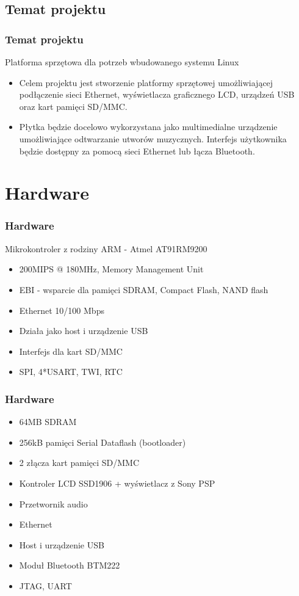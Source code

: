 \documentclass{beamer}
\newenvironment{ramka}{\begin{frame}}
{
		\end{frame}
}
\begin{document}
	\subsection{Temat projektu}
	\begin{ramka}
		\frametitle{Temat projektu}
		\begin{block}{Platforma sprzętowa dla potrzeb wbudowanego systemu Linux}
			\begin{itemize}
			\item<1->Celem projektu jest stworzenie platformy sprzętowej umożliwiającej podłączenie sieci Ethernet, wyświetlacza graficznego LCD, urządzeń USB oraz kart pamięci SD/MMC.\\
			\item<2->Płytka będzie docelowo wykorzystana jako multimedialne urządzenie umożliwiające odtwarzanie utworów muzycznych. Interfejs użytkownika będzie dostępny za pomocą sieci Ethernet lub łącza Bluetooth.
			\end{itemize}
		\end{block}
	\end{ramka} 
	
	\section{Hardware}
	\begin{ramka}
		\frametitle{Hardware}
		\begin{block}{Mikrokontroler z rodziny ARM - Atmel AT91RM9200}
			\begin{itemize}
				\item<2-> 200MIPS @ 180MHz, Memory Management Unit
				\item<3-> EBI - wsparcie dla pamięci SDRAM, Compact Flash, NAND flash
				\item<4-> Ethernet 10/100 Mbps
				\item<5-> Działa jako host i urządzenie USB
				\item<6-> Interfejs dla kart SD/MMC
				\item<7-> SPI, 4*USART, TWI, RTC
			\end{itemize}
		\end{block}
	\end{ramka} 
	
	\begin{ramka}
		\frametitle{Hardware}
		\begin{itemize}
			\item<1-> 64MB SDRAM
			\item<1-> 256kB pamięci Serial Dataflash (bootloader)
			\item<1-> 2 złącza kart pamięci SD/MMC
			\item<1-> Kontroler LCD SSD1906 + wyświetlacz z Sony PSP
			\item<1-> Przetwornik audio
			\item<1-> Ethernet
			\item<1-> Host i urządzenie USB
			\item<1-> Moduł Bluetooth BTM222
			\item<1-> JTAG, UART
		\end{itemize}
	\end{ramka} 
	
\end{document}
